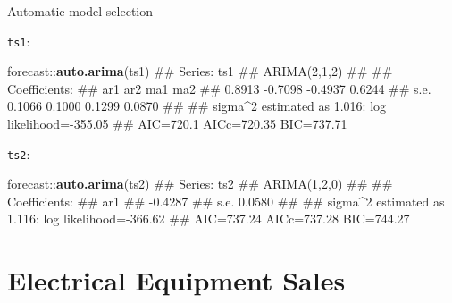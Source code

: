 \documentclass[11pt,ignorenonframetext,]{beamer}
\newenvironment{Shaded}{}{}
\newcommand{\KeywordTok}[1]{\textcolor[rgb]{0.00,0.44,0.13}{\textbf{#1}}}
\newcommand{\NormalTok}[1]{#1}
\newcommand{\OperatorTok}[1]{\textcolor[rgb]{0.40,0.40,0.40}{#1}}
\let\oldShaded\Shaded
\let\endoldShaded\endShaded
\renewenvironment{Shaded}{\footnotesize\begin{spacing}{0.9}\oldShaded}{\endoldShaded\end{spacing}}
\let\oldverbatim\verbatim
\let\endoldverbatim\endverbatim
\newcommand{\scriptoutput}{
  \renewenvironment{Shaded}{\scriptsize\begin{spacing}{0.9}\oldShaded}{\endoldShaded\end{spacing}}
  \renewenvironment{verbatim}{\scriptsize\begin{spacing}{0.9}\oldverbatim}{\endoldverbatim\end{spacing}}
}
\begin{document}
\begin{frame}[fragile]{%
\protect\hypertarget{automatic-model-selection}{%
Automatic model selection}}

\scriptoutput

\texttt{ts1}:

\begin{Shaded}
\begin{Highlighting}[]
\NormalTok{forecast}\OperatorTok{::}\KeywordTok{auto.arima}\NormalTok{(ts1)}
\NormalTok{## Series: ts1 }
\NormalTok{## ARIMA(2,1,2) }
\NormalTok{## }
\NormalTok{## Coefficients:}
\NormalTok{##          ar1      ar2      ma1     ma2}
\NormalTok{##       0.8913  -0.7098  -0.4937  0.6244}
\NormalTok{## s.e.  0.1066   0.1000   0.1299  0.0870}
\NormalTok{## }
\NormalTok{## sigma^2 estimated as 1.016:  log likelihood=-355.05}
\NormalTok{## AIC=720.1   AICc=720.35   BIC=737.71}
\end{Highlighting}
\end{Shaded}

\texttt{ts2}:

\begin{Shaded}
\begin{Highlighting}[]
\NormalTok{forecast}\OperatorTok{::}\KeywordTok{auto.arima}\NormalTok{(ts2)}
\NormalTok{## Series: ts2 }
\NormalTok{## ARIMA(1,2,0) }
\NormalTok{## }
\NormalTok{## Coefficients:}
\NormalTok{##           ar1}
\NormalTok{##       -0.4287}
\NormalTok{## s.e.   0.0580}
\NormalTok{## }
\NormalTok{## sigma^2 estimated as 1.116:  log likelihood=-366.62}
\NormalTok{## AIC=737.24   AICc=737.28   BIC=744.27}
\end{Highlighting}
\end{Shaded}

\end{frame}

\hypertarget{electrical-equipment-sales}{%
\section{Electrical Equipment Sales}\label{electrical-equipment-sales}}
\end{document}
